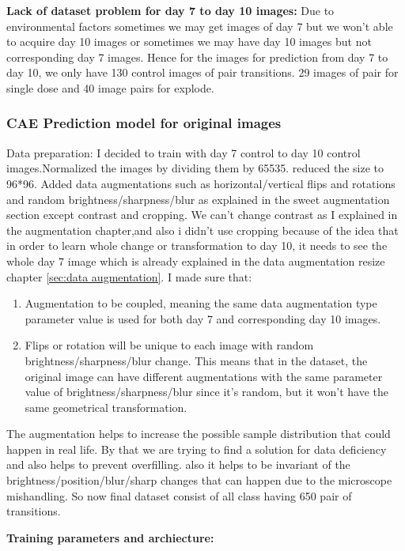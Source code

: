 \textbf{Lack of dataset problem for day 7 to day 10 images:}
Due to environmental factors sometimes we may get images of day 7  but we won't able to acquire  day 10 images or sometimes we may have day 10 images but not corresponding day 7 images. Hence for the images for prediction from day 7 to day 10, we only have 130 control images of pair transitions. 29 images of pair for single dose and 40 image pairs for explode. 

\subsubsection*{CAE Prediction model for original images}
Data preparation: I decided to train with day 7 control to day 10 control images.Normalized the images by dividing them by 65535. reduced the size to 96*96. Added data augmentations such as horizontal/vertical flips and rotations and random brightness/sharpness/blur as explained in the sweet augmentation section  except contrast and cropping. We can't change contrast  as I explained in the augmentation chapter,and also i didn't use cropping because of the idea that in order to learn whole change or transformation to day 10, it needs to see the whole day 7 image which is already explained in the data augmentation resize chapter \ref{sec:data augmentation}. I made sure that:
\begin{enumerate}
  \item Augmentation to be coupled, meaning the same data augmentation type parameter value is used for both day 7 and corresponding day 10 images.
  \item Flips or rotation will be unique to each image with random brightness/sharpness/blur change. This means that in the dataset, the original image can have different augmentations with the same parameter value of brightness/sharpness/blur since it's random, but it won't have the same geometrical transformation.
\end{enumerate}


The augmentation helps to increase the possible sample distribution that could happen in real life. By that we are trying to find a solution for data deficiency and also helps to prevent overfilling. also it helps to be invariant of the brightness/position/blur/sharp changes that can happen due to the microscope mishandling. So now final dataset consist of all class having 650 pair of transitions.


\textbf{Training parameters and archiecture:}

